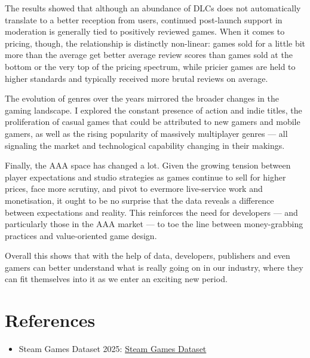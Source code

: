 \documentclass[
]{article}
\providecommand{\tightlist}{%
  \setlength{\itemsep}{0pt}\setlength{\parskip}{0pt}}
\begin{document}
The results showed that although an abundance of DLCs does not
automatically translate to a better reception from users, continued
post-launch support in moderation is generally tied to positively
reviewed games. When it comes to pricing, though, the relationship is
distinctly non-linear: games sold for a little bit more than the average
get better average review scores than games sold at the bottom or the
very top of the pricing spectrum, while pricier games are held to higher
standards and typically received more brutal reviews on average.

The evolution of genres over the years mirrored the broader changes in
the gaming landscape. I explored the constant presence of action and
indie titles, the proliferation of casual games that could be attributed
to new gamers and mobile gamers, as well as the rising popularity of
massively multiplayer genres --- all signaling the market and
technological capability changing in their makings.

Finally, the AAA space has changed a lot. Given the growing tension
between player expectations and studio strategies as games continue to
sell for higher prices, face more scrutiny, and pivot to evermore
live-service work and monetisation, it ought to be no surprise that the
data reveals a difference between expectations and reality. This
reinforces the need for developers --- and particularly those in the AAA
market --- to toe the line between money-grabbing practices and
value-oriented game design.

Overall this shows that with the help of data, developers, publishers
and even gamers can better understand what is really going on in our
industry, where they can fit themselves into it as we enter an exciting
new period.

\section{References}\label{references}

\begin{itemize}
\tightlist
\item
  Steam Games Dataset 2025:
  \href{https://www.kaggle.com/datasets/nikhilroxtomar/steam-games-dataset-2025}{Steam
  Games Dataset}
\end{itemize}
\end{document}
